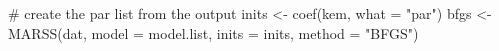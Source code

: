 \begin{Schunk}
\begin{Sinput}
 # create the par list from the output
 inits <- coef(kem, what = "par")
 bfgs <- MARSS(dat, model = model.list, inits = inits, method = "BFGS")
\end{Sinput}
\end{Schunk}
